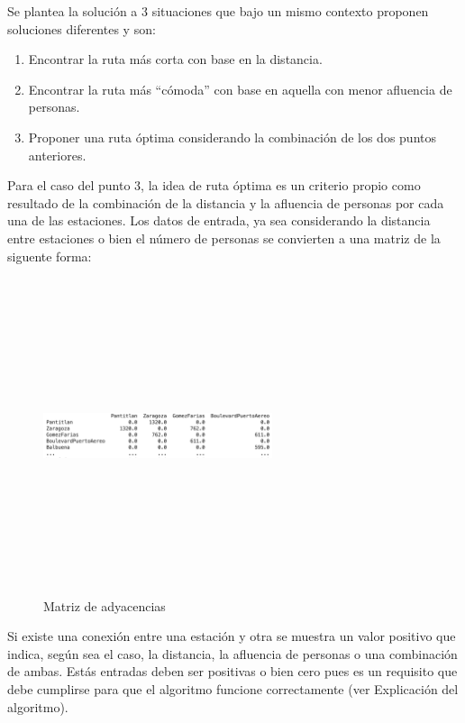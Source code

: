 \documentclass[
]{article}
\providecommand{\tightlist}{%
  \setlength{\itemsep}{0pt}\setlength{\parskip}{0pt}}
\begin{document}
Se plantea la solución a 3 situaciones que bajo un mismo contexto
proponen soluciones diferentes y son:

\begin{enumerate}
\def\labelenumi{\arabic{enumi}.}
\tightlist
\item
  Encontrar la ruta más corta con base en la distancia.
\item
  Encontrar la ruta más ``cómoda'' con base en aquella con menor
  afluencia de personas.
\item
  Proponer una ruta óptima considerando la combinación de los dos puntos
  anteriores.
\end{enumerate}

Para el caso del punto 3, la idea de ruta óptima es un criterio propio
como resultado de la combinación de la distancia y la afluencia de
personas por cada una de las estaciones. Los datos de entrada, ya sea
considerando la distancia entre estaciones o bien el número de personas
se convierten a una matriz de la siguente forma:

\begin{figure}
\centering
\includegraphics[width=0.6\textwidth,height=3.64583in]{Imagenes/matrix_imagen.png}
\caption{Matriz de adyacencias}
\end{figure}

Si existe una conexión entre una estación y otra se muestra un valor
positivo que indica, según sea el caso, la distancia, la afluencia de
personas o una combinación de ambas. Estás entradas deben ser positivas
o bien cero pues es un requisito que debe cumplirse para que el
algoritmo funcione correctamente (ver Explicación del algoritmo).
\end{document}
